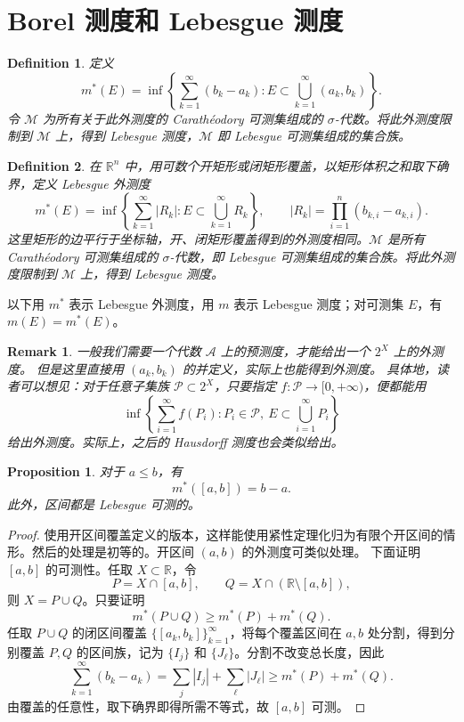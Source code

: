 \documentclass[12pt,letterpaper,twoside,openright]{ctexbook}
\theoremstyle{bluehead}
\newtheorem{proposition}[theorem]{Proposition}
\theoremstyle{olivehead}
\newtheorem{definition}{Definition}
\theoremstyle{orangehead}
\theoremstyle{redremark}
\newtheorem*{remark}{Remark}
\begin{document}
\section{Borel 测度和 Lebesgue 测度}



\begin{definition}
定义
\[
m^*(E)=\inf\left\{\sum_{k=1}^{\infty}(b_k-a_k):
E\subset\bigcup_{k=1}^{\infty}(a_k,b_k)\right\}.
\]
令 $\mathcal{M}$ 为所有关于此外测度的 Carathéodory 可测集组成的 $\sigma$-代数。将此外测度限制到 $\mathcal{M}$ 上，得到 Lebesgue 测度，$\mathcal{M}$ 即 Lebesgue 可测集组成的集合族。
\end{definition}
\begin{definition}\label{def:lebesgue-outer-measure-rn}
在 $\mathbb{R}^n$ 中，用可数个开矩形或闭矩形覆盖，以矩形体积之和取下确界，定义 Lebesgue 外测度
\[
m^*(E)=\inf\left\{\sum_{k=1}^{\infty}|R_k|:
E\subset\bigcup_{k=1}^{\infty}R_k\right\},
\qquad
|R_k|=\prod_{i=1}^{n}(b_{k,i}-a_{k,i}).
\]
这里矩形的边平行于坐标轴，开、闭矩形覆盖得到的外测度相同。$\mathcal{M}$ 是所有 Carathéodory 可测集组成的 $\sigma$-代数，即 Lebesgue 可测集组成的集合族。将此外测度限制到 $\mathcal{M}$ 上，得到 Lebesgue 测度。
\end{definition}
以下用 $m^*$ 表示 Lebesgue 外测度，用 $m$ 表示 Lebesgue 测度；对可测集 $E$，有 $m(E)=m^*(E)$。




\begin{remark}
一般我们需要一个代数 $\mathcal{A}$ 上的预测度，才能给出一个 $2^X$ 上的外测度。
但是这里直接用 $(a_k,b_k)$ 的并定义，实际上也能得到外测度。
具体地，读者可以想见：对于任意子集族 $\mathcal{P}\subset 2^X$，只要指定
$f:\mathcal{P}\to[0,+\infty)$，便都能用
\[
\inf\left\{\sum_{i=1}^{\infty}f(P_i):
P_i\in\mathcal{P},\ E\subset\bigcup_{i=1}^{\infty}P_i\right\}
\]
给出外测度。实际上，之后的 Hausdorff 测度也会类似给出。
\end{remark}

\begin{proposition}\label{prop:interval-lebesgue-measure}
对于 $a\leq b$，有
\[
m^*([a,b])=b-a.
\]
此外，区间都是 Lebesgue 可测的。
\end{proposition}
\begin{proof}
使用开区间覆盖定义的版本，这样能使用紧性定理化归为有限个开区间的情形。然后的处理是初等的。开区间 $(a,b)$ 的外测度可类似处理。
下面证明 $[a,b]$ 的可测性。任取 $X\subset\mathbb{R}$，令
\[
P=X\cap[a,b],\qquad Q=X\cap(\mathbb{R}\setminus[a,b]),
\]
则 $X=P\cup Q$。只要证明
\[
m^*(P\cup Q)\geq m^*(P)+m^*(Q).
\]
任取 $P\cup Q$ 的闭区间覆盖 $\{[a_k,b_k]\}_{k=1}^{\infty}$，将每个覆盖区间在 $a,b$ 处分割，得到分别覆盖 $P,Q$ 的区间族，记为 $\{I_j\}$ 和 $\{J_\ell\}$。分割不改变总长度，因此
\[
\sum_{k=1}^{\infty}(b_k-a_k)
=\sum_j|I_j|+\sum_\ell|J_\ell|
\geq m^*(P)+m^*(Q).
\]
由覆盖的任意性，取下确界即得所需不等式，故 $[a,b]$ 可测。
\end{proof}
\end{document}
